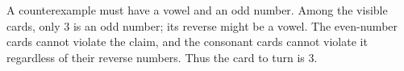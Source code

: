 A counterexample must have a vowel and an odd number. Among the visible cards, only $3$ is an odd number; its reverse might be a vowel. The even-number cards cannot violate the claim, and the consonant cards cannot violate it regardless of their reverse numbers. Thus the card to turn is $\boxed3$.
